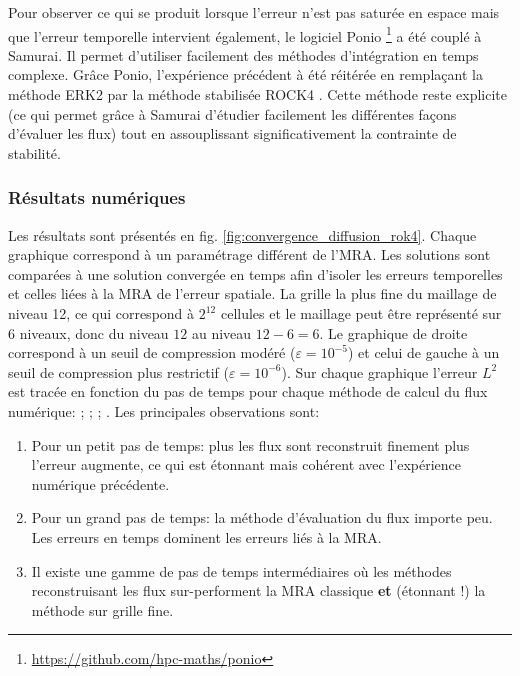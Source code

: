 \label{par:etude_diff_rock4}
Pour observer ce qui se produit lorsque l'erreur n'est pas saturée en espace mais que l'erreur temporelle intervient également, 
le logiciel Ponio \footnote{\href{https://github.com/hpc-maths/ponio}{https://github.com/hpc-maths/ponio}} a été couplé à Samurai.
Il permet d'utiliser facilement des méthodes d'intégration en temps complexe. 
Grâce Ponio, l’expérience précédent à été réitérée en remplaçant la méthode ERK2 par la méthode stabilisée ROCK4 \cite{AbdulleMedovikov2001}. 
Cette méthode reste explicite (ce qui permet grâce à Samurai d'étudier facilement les différentes façons d'évaluer les flux) 
tout en assouplissant significativement la contrainte de stabilité.
\subsubsection{Résultats numériques}
    Les résultats sont présentés en fig. \ref{fig:convergence_diffusion_rok4}. Chaque graphique correspond à un paramétrage différent de l'MRA. 
    Les solutions sont comparées à une solution convergée en temps afin d'isoler les erreurs temporelles et celles liées à la MRA de l'erreur spatiale.
    La grille la plus fine du maillage de niveau 12, ce qui correspond à $2^{12}$ cellules et le maillage peut être représenté sur 6 niveaux, donc du niveau $12$ au niveau $12-6=6$.
    Le graphique de droite correspond à un seuil de compression modéré ($\varepsilon = 10^{-5}$) et celui de gauche à un seuil de compression plus restrictif ($\varepsilon = 10^{-6}$).
    Sur chaque graphique l'erreur $L^2$ est tracée en fonction du pas de temps pour chaque méthode de calcul du flux numérique:
{} ;
{} ;
{} ;
{}.
    Les principales observations sont:
    \begin{enumerate}
        \item Pour un petit pas de temps: plus les flux sont reconstruit finement plus l'erreur augmente, ce qui est étonnant mais cohérent avec l'expérience numérique précédente.
        \item Pour un grand pas de temps: la méthode d'évaluation du flux importe peu. Les erreurs en temps dominent les erreurs liés à la MRA.
        \item Il existe une gamme de pas de temps intermédiaires où les méthodes reconstruisant les flux sur-performent la MRA classique \textbf{et} (étonnant !) la méthode sur grille fine.
    \end{enumerate}
